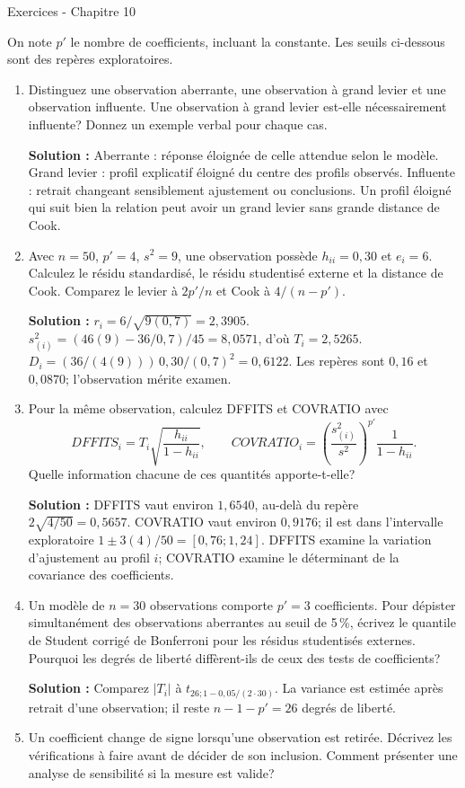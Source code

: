 \documentclass[letterpaper,11pt]{article}
\newcommand{\prof}[1]{\ifdefined\avecsolutions\par{\color{blue}\textbf{Solution :} #1}\par\fi}
\begin{document}
\begin{center}{\Large Exercices - Chapitre 10}\end{center}
On note $p'$ le nombre de coefficients, incluant la constante. Les seuils ci-dessous sont des repères exploratoires.
\begin{enumerate}[leftmargin=*,wide,label=\bfseries Exercice \arabic*:]
\item Distinguez une observation aberrante, une observation à grand levier et une observation influente. Une observation à grand levier est-elle nécessairement influente? Donnez un exemple verbal pour chaque cas.
\prof{Aberrante : réponse éloignée de celle attendue selon le modèle. Grand levier : profil explicatif éloigné du centre des profils observés. Influente : retrait changeant sensiblement ajustement ou conclusions. Un profil éloigné qui suit bien la relation peut avoir un grand levier sans grande distance de Cook.}
\item Avec $n=50$, $p'=4$, $s^2=9$, une observation possède $h_{ii}=0{,}30$ et $e_i=6$. Calculez le résidu standardisé, le résidu studentisé externe et la distance de Cook. Comparez le levier à $2p'/n$ et Cook à $4/(n-p')$.
\prof{$r_i=6/\sqrt{9(0{,}7)}=2{,}3905$. $s_{(i)}^2=(46(9)-36/0{,}7)/45=8{,}0571$, d'où $T_i=2{,}5265$. $D_i=(36/(4(9)))\,0{,}30/(0{,}7)^2=0{,}6122$. Les repères sont $0{,}16$ et $0{,}0870$; l'observation mérite examen.}
\item Pour la même observation, calculez DFFITS et COVRATIO avec
\[
DFFITS_i=T_i\sqrt{\frac{h_{ii}}{1-h_{ii}}},\qquad
COVRATIO_i=\left(\frac{s_{(i)}^2}{s^2}\right)^{p'}\frac1{1-h_{ii}}.
\]
Quelle information chacune de ces quantités apporte-t-elle?
\prof{DFFITS vaut environ $1{,}6540$, au-delà du repère $2\sqrt{4/50}=0{,}5657$. COVRATIO vaut environ $0{,}9176$; il est dans l'intervalle exploratoire $1\pm3(4)/50=[0{,}76;1{,}24]$. DFFITS examine la variation d'ajustement au profil $i$; COVRATIO examine le déterminant de la covariance des coefficients.}
\item Un modèle de $n=30$ observations comporte $p'=3$ coefficients. Pour dépister simultanément des observations aberrantes au seuil de 5\,\%, écrivez le quantile de Student corrigé de Bonferroni pour les résidus studentisés externes. Pourquoi les degrés de liberté diffèrent-ils de ceux des tests de coefficients?
\prof{Comparez $|T_i|$ à $t_{26;1-0{,}05/(2\cdot30)}$. La variance est estimée après retrait d'une observation; il reste $n-1-p'=26$ degrés de liberté.}
\item Un coefficient change de signe lorsqu'une observation est retirée. Décrivez les vérifications à faire avant de décider de son inclusion. Comment présenter une analyse de sensibilité si la mesure est valide?

\end{enumerate}
\end{document}
